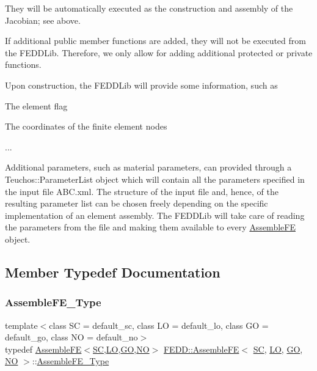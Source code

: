 They will be automatically executed as the construction and assembly of the Jacobian; see above.

If additional public member functions are added, they will not be executed from the F\+E\+D\+D\+Lib. Therefore, we only allow for adding additional protected or private functions.

Upon construction, the F\+E\+D\+D\+Lib will provide some information, such as
\begin{DoxyItemize}
\item The element flag
\item The coordinates of the finite element nodes
\item ...
\end{DoxyItemize}

Additional parameters, such as material parameters, can provided through a Teuchos\+::\+Parameter\+List object which will contain all the parameters specified in the input file {\ttfamily A\+B\+C.\+xml}. The structure of the input file and, hence, of the resulting parameter list can be chosen freely depending on the specific implementation of an element assembly. The F\+E\+D\+D\+Lib will take care of reading the parameters from the file and making them available to every \hyperlink{classFEDD_1_1AssembleFE}{Assemble\+FE} object. 

\subsection{Member Typedef Documentation}
\mbox{\label{classFEDD_1_1AssembleFE_ab2c8bb1fd65dfcf7899a7c4a4a8a4021}} 
\subsubsection{\texorpdfstring{Assemble\+F\+E\+\_\+\+Type}{AssembleFE\_Type}}
{\footnotesize\ttfamily template$<$class SC  = default\+\_\+sc, class LO  = default\+\_\+lo, class GO  = default\+\_\+go, class NO  = default\+\_\+no$>$ \\
typedef \hyperlink{classFEDD_1_1AssembleFE}{Assemble\+FE}$<$\hyperlink{fe__test__laplace_8cpp_a79c7e86a57edbb2a5a53242bcd04e41e}{SC},\hyperlink{fe__test__laplace_8cpp_ad6a38c9f07d3fd633eefca5bccad8410}{LO},\hyperlink{fe__test__laplace_8cpp_afa2946b509009b4f45eb04bd8c5b27d9}{GO},\hyperlink{fe__test__laplace_8cpp_a5e24f37b28787429872b6ecb1d0417ce}{NO}$>$ \hyperlink{classFEDD_1_1AssembleFE}{F\+E\+D\+D\+::\+Assemble\+FE}$<$ \hyperlink{fe__test__laplace_8cpp_a79c7e86a57edbb2a5a53242bcd04e41e}{SC}, \hyperlink{fe__test__laplace_8cpp_ad6a38c9f07d3fd633eefca5bccad8410}{LO}, \hyperlink{fe__test__laplace_8cpp_afa2946b509009b4f45eb04bd8c5b27d9}{GO}, \hyperlink{fe__test__laplace_8cpp_a5e24f37b28787429872b6ecb1d0417ce}{NO} $>$\+::\hyperlink{classFEDD_1_1AssembleFE_ab2c8bb1fd65dfcf7899a7c4a4a8a4021}{Assemble\+F\+E\+\_\+\+Type}}

